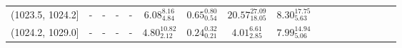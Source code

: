 \begin{tabular}{@{\extracolsep\fill}rcccccccccccccccc}
(1023.5, 1024.2] &                            - &                           - &                           - &                          - &           $6.08_{4.84}^{8.16}$ &            $0.65_{0.54}^{0.80}$ &        $20.57_{18.05}^{27.09}$ &         $8.30_{5.63}^{17.75}$ \\
(1024.2, 1029.0] &                            - &                           - &                           - &                          - &          $4.80_{2.12}^{10.82}$ &            $0.24_{0.21}^{0.32}$ &           $4.01_{2.85}^{6.61}$ &         $7.99_{5.06}^{14.94}$ \\
\bottomrule
\end{tabular}
